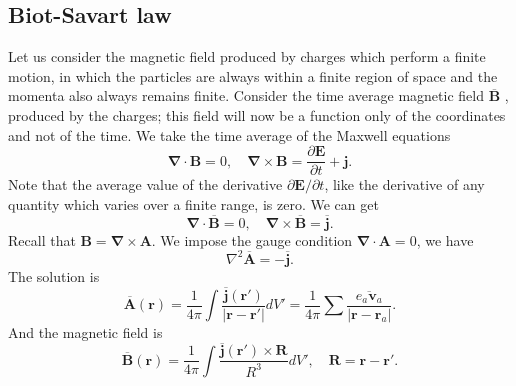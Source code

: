 \subsection{Biot-Savart law}
Let us consider the magnetic field produced by charges which perform a finite motion, in which the particles are always within a finite region of space and the momenta also always remains finite. Consider the time average magnetic field $\overline{\bm{B}}$ , produced by the charges; this field will now be a function only of the coordinates and not of the time. We take the time average of the Maxwell equations
\[\bm{\nabla} \cdot \bm{B} = 0 , \quad \bm{\nabla} \times \bm{B} = \frac{\partial \bm{E}}{\partial t} + \bm{j}.\] 
Note that the average value of the derivative $\partial \bm{E} / \partial t$, like the derivative of any quantity which varies over a finite range, is zero. We can get
\[\bm{\nabla} \cdot \overline{\bm{B}} = 0 , \quad \bm{\nabla} \times \overline{\bm{B}} =  \overline{\bm{j}}.\]
Recall that $\bm{B} = \bm{\nabla} \times \bm{A}$. We impose the gauge condition $\bm{\nabla} \cdot \bm{A} = 0$, we have
\[\nabla^2 \overline{\bm{A}} = - \overline{\bm{j}}.\]
The solution is
\[\overline{\bm{A}}(\bm{r}) = \frac{1}{4\pi} \int \frac{\overline{\bm{j}}(\bm{r}')}{|\bm{r}-\bm{r}'|} dV' = \frac{1}{4\pi} \sum \overline{\frac{e_a \bm{v}_a}{|\bm{r}-\bm{r}_a|}}.\]
And the magnetic field is
\[\overline{\bm{B}}(\bm{r}) = \frac{1}{4\pi} \int \frac{\overline{\bm{j}}(\bm{r}') \times \bm{R}}{R^3} dV' , \quad \bm{R} = \bm{r}-\bm{r}'.\]

